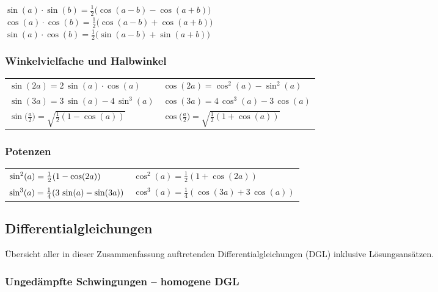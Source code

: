 $\sin(a) \cdot \sin(b) = \frac{1}{2} \big( \cos(a-b) - \cos(a+b) \big) $ \\
$\cos(a) \cdot \cos(b) = \frac{1}{2} \big( \cos(a-b) + \cos(a+b) \big) $ \\
$\sin(a) \cdot \cos(b) = \frac{1}{2} \big( \sin(a-b) + \sin(a+b) \big) $


\subsubsection{Winkelvielfache und Halbwinkel}

\renewcommand{\arraystretch}{1.3}
\begin{tabular}{ll}
  $\sin(2a) = 2 \, \sin(a) \cdot \cos(a)$                         & $\cos(2a) = \cos^2(a) - \sin^2(a)$                                \\
  $\sin(3a) = 3 \, \sin(a) -4 \, \sin^3(a)$                       & $\cos(3a) = 4 \, \cos^3(a) -3 \, \cos(a)$                         \\
  $\sin \big( \frac{a}{2} \big) = \sqrt{\frac{1}{2}(1-\cos(a))} $ & $\cos \big( \frac{a}{2} \big) = \sqrt{\frac{1}{2}(1+\cos(a))} $
\end{tabular}

\subsubsection{Potenzen}

\renewcommand{\arraystretch}{1.5}
\begin{tabular}{ll}
  $\sin^2(a) = \frac{1^{\mathstrut}}{2}(1-\cos(2a))$               & $\cos^2(a) = \frac{1}{2}(1+\cos(2a))$                \\
  $\sin^3(a) = \frac{1^{\mathstrut}}{4}(3\, \sin(a) - \sin(3a))$   & $\cos^3(a) = \frac{1}{4}(\cos(3a) + 3 \, \cos(a))$
\end{tabular}
\renewcommand{\arraystretch}{1}
\subsection{Differentialgleichungen}\label{Differentialgleichungen}

Übersicht aller in dieser Zusammenfassung auftretenden Differentialgleichungen (DGL) inklusive Lösungsansätzen.

\subsubsection{Ungedämpfte Schwingungen -- homogene DGL}

